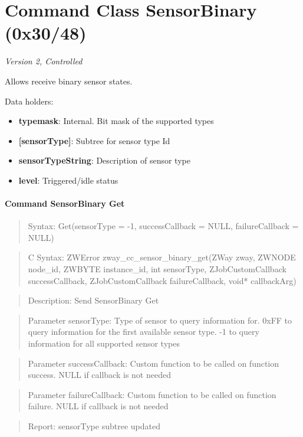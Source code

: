 \section{Command Class SensorBinary (0x30/48)}

\textit{Version 2, Controlled}
\newline

Allows receive binary sensor states.
\newline

\noindent
Data holders:

\begin{itemize}
\item \textbf{typemask}: Internal. Bit mask of the supported types
\item \textbf{[sensorType]}: Subtree for sensor type Id
\item \qquad\textbf{sensorTypeString}: Description of sensor type
\item \qquad\textbf{level}: Triggered/idle status
\end{itemize}

\paragraph{Command SensorBinary Get}
\begin{quote}Syntax: Get(sensorType = -1, successCallback = NULL, failureCallback = NULL)\end{quote}
\begin{quote}C Syntax: ZWError zway\_cc\_sensor\_binary\_get(ZWay zway, ZWNODE node\_id, ZWBYTE instance\_id, int sensorType, ZJobCustomCallback successCallback, ZJobCustomCallback failureCallback, void* callbackArg)\end{quote}
\begin{quote}Description: Send SensorBinary Get\end{quote}
\begin{quote}Parameter sensorType: Type of sensor to query information for. 0xFF to query information for the first available sensor type. -1 to query information for all supported sensor types\end{quote}
\begin{quote}Parameter successCallback: Custom function to be called on function success. NULL if callback is not needed\end{quote}
\begin{quote}Parameter failureCallback: Custom function to be called on function failure. NULL if callback is not needed\end{quote}
\begin{quote}Report: sensorType subtree updated\end{quote}


